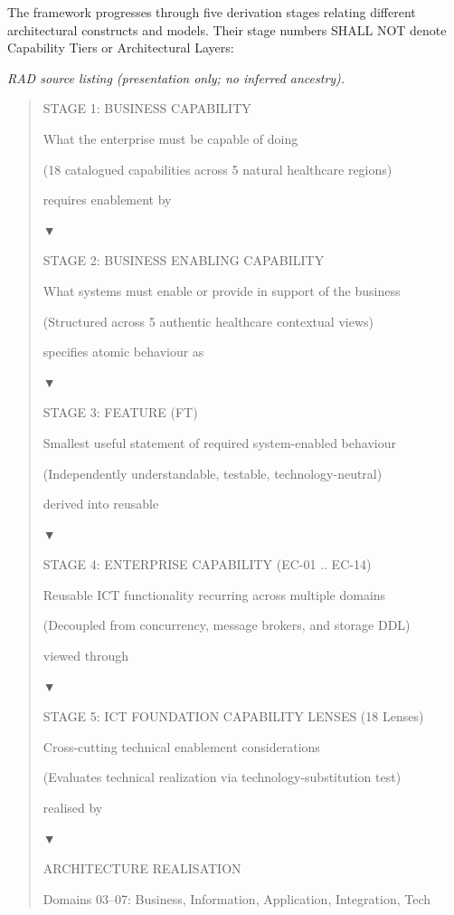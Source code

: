 The framework progresses through five derivation stages relating different architectural constructs and models. Their stage numbers SHALL NOT denote Capability Tiers or Architectural Layers:

\label{rad:tier-model:49}

\textit{RAD source listing (presentation only; no inferred ancestry).}
\begin{quote}
STAGE 1: BUSINESS CAPABILITY

What the enterprise must be capable of doing

(18 catalogued capabilities across 5 natural healthcare regions)

requires enablement by

▼

STAGE 2: BUSINESS ENABLING CAPABILITY

What systems must enable or provide in support of the business

(Structured across 5 authentic healthcare contextual views)

specifies atomic behaviour as

▼

STAGE 3: FEATURE (FT)

Smallest useful statement of required system-enabled behaviour

(Independently understandable, testable, technology-neutral)

derived into reusable

▼

STAGE 4: ENTERPRISE CAPABILITY (EC-01 .. EC-14)

Reusable ICT functionality recurring across multiple domains

(Decoupled from concurrency, message brokers, and storage DDL)

viewed through

▼

STAGE 5: ICT FOUNDATION CAPABILITY LENSES (18 Lenses)

Cross-cutting technical enablement considerations

(Evaluates technical realization via technology-substitution test)

realised by

▼

ARCHITECTURE REALISATION

Domains 03–07: Business, Information, Application, Integration, Tech
\end{quote}
\label{rad:tier-model:91}

